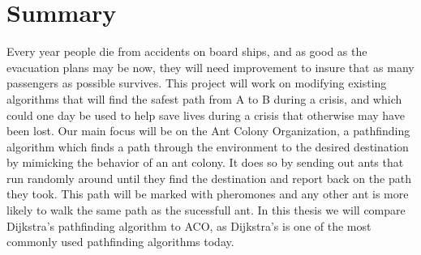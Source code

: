 \chapter{Summary}
\label{ch:summary}


Every year people die from accidents on board ships, and as good as the evacuation plans may be now, they will need improvement to insure that as many passengers as possible survives. This project will work on modifying existing algorithms that will find the safest path from A to B during a crisis, and which could one day be used to help save lives during a crisis that otherwise may have been lost. Our main focus will be on the Ant Colony Organization, a pathfinding algorithm which finds a path through the environment to the desired destination by mimicking the behavior of an ant colony. It does so by sending out ants that run randomly around until they find the destination and report back on the path they took. This path will be marked with pheromones and any other ant is more likely to walk the same path as the sucessfull ant. In this thesis we will compare Dijkstra's pathfinding algorithm to ACO, as Dijkstra's is one of the most commonly used pathfinding algorithms today.